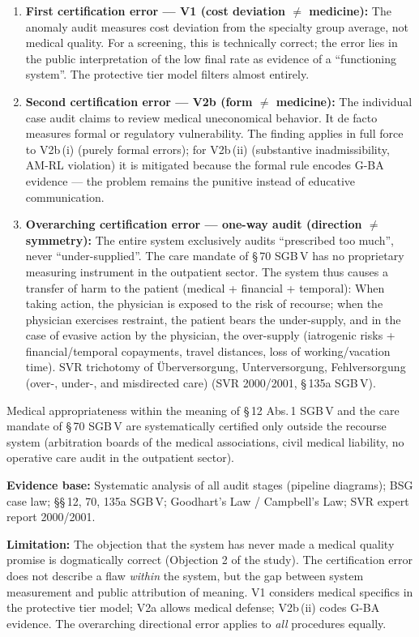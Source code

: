 \documentclass{umbruch-position}
\providecommand{\textgerman}[1]{#1}
\begin{document}
\begin{enumerate}
  \item \textbf{First certification error --- V1 (cost deviation $\neq$ medicine):} The anomaly audit measures cost deviation from the specialty group average, not medical quality. For a screening, this is technically correct; the error lies in the public interpretation of the low final rate as evidence of a ``functioning system''. The protective tier model filters almost entirely.
  \item \textbf{Second certification error --- V2b (form $\neq$ medicine):} The individual case audit claims to review medical uneconomical behavior. It de facto measures formal or regulatory vulnerability. The finding applies in full force to V2b\,(i) (purely formal errors); for V2b\,(ii) (substantive inadmissibility, AM-RL violation) it is mitigated because the formal rule encodes G-BA evidence --- the problem remains the punitive instead of educative communication.
  \item \textbf{Overarching certification error --- one-way audit (direction $\neq$ symmetry):} The entire system exclusively audits ``prescribed too much'', never ``under-supplied''. The care mandate of \S\,70 SGB\,V has no proprietary measuring instrument in the outpatient sector. The system thus causes a transfer of harm to the patient (medical + financial + temporal): When taking action, the physician is exposed to the risk of recourse; when the physician exercises restraint, the patient bears the under-supply, and in the case of evasive action by the physician, the over-supply (iatrogenic risks + financial/temporal copayments, travel distances, loss of working/vacation time). SVR trichotomy of \textgerman{Überversorgung, Unterversorgung, Fehlversorgung} (over-, under-, and misdirected care) (SVR 2000/2001, \S\,135a SGB\,V).
\end{enumerate}

Medical appropriateness within the meaning of \S\,12 Abs.\,1 SGB\,V and the care mandate of \S\,70 SGB\,V are systematically certified only outside the recourse system (arbitration boards of the medical associations, civil medical liability, no operative care audit in the outpatient sector).

\textbf{Evidence base:} Systematic analysis of all audit stages (pipeline diagrams); BSG case law; \S\S\,12, 70, 135a SGB\,V; Goodhart's Law / Campbell's Law; SVR expert report 2000/2001.

\textbf{Limitation:} The objection that the system has never made a medical quality promise is dogmatically correct (Objection 2 of the study). The certification error does not describe a flaw \textit{within} the system, but the gap between system measurement and public attribution of meaning. V1 considers medical specifics in the protective tier model; V2a allows medical defense; V2b\,(ii) codes G-BA evidence. The overarching directional error applies to \emph{all} procedures equally.
\end{document}

